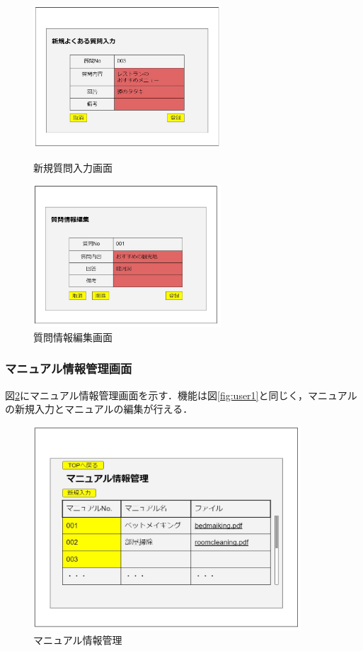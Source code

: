 \documentclass[main]{subfiles}
\begin{document}
\begin{figure}[H]
    \begin{minipage}{0.5\hsize}
        \centering
        \includegraphics[width=7cm]{UI-umino/que2.JPG}
        \caption{新規質問入力画面}
        \label{fig:que2}
    \end{minipage}
    \begin{minipage}{0.5\hsize}
        \centering
        \includegraphics[width=7cm]{UI-umino/que3.JPG}
        \caption{質問情報編集画面}
        \label{fig:que3}
    \end{minipage} 
\end{figure}

\subsubsection{マニュアル情報管理画面}
図\ref{fig:manyu1}にマニュアル情報管理画面を示す．機能は図\ref{fig:user1}と同じく，マニュアルの新規入力とマニュアルの編集が行える．

\begin{figure}[H]
 \centering
   \includegraphics[width=100mm]{UI-umino/manyu1.JPG}
 \caption{マニュアル情報管理}
 \label{fig:manyu1}
\end{figure}
\end{document}
